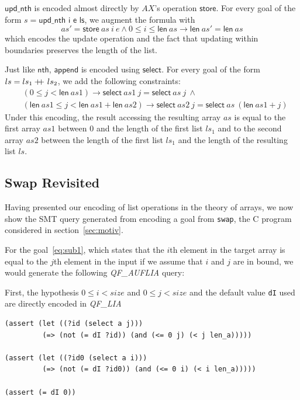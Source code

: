 \documentclass[onecolumn, preprint]{sigplanconf}
\newcommand\doubleplus{+\kern-1.3ex+\kern0.8ex}
\begin{document}
$\textsf{upd\_nth}$ is encoded almost directly by $AX$'s operation $\textsf{store}$. For every goal of the form $s = \textsf{upd\_nth\ i\ e\ ls}$, we augment the formula with
$$ as' = \textsf{store}\ as\ i\ e \wedge 0 \leq i \leq \textsf{len}\ as \to \textsf{len}\ as' = \textsf{len}\ as$$
which encodes the update operation and the fact that updating within boundaries preserves the length of the list.


Just like $\textsf{nth}$, $\textsf{append}$ is encoded using $\textsf{select}$. For every goal of the form $ls = ls_1 \doubleplus ls_2$, we add the following constraints:
\begin{align*}
&(0 \leq j < \textsf{len}\ as1) \to \textsf{select}\ as1\ j = \textsf{select}\ as\ j\ \wedge \\
&(\textsf{len}\ as1 \leq j < \textsf{len}\ as1 + \textsf{len}\ as2) \to \textsf{select}\ as2\ j = \textsf{select}\ as\ (\textsf{len}\ as1 + j)
  \end{align*}
Under this encoding, the result accessing the resulting array $as$ is equal to the first array $as1$ between $0$ and the length of the first list $ls_1$ and to the second array $as2$ between the length of the first list $ls_1$ and the length of the resulting list $ls$.


\subsection{Swap Revisited}

Having presented our encoding of list operations in the theory of arrays, we now show the SMT query generated from encoding a goal from \texttt{swap}, the C program considered in section~\ref{sec:motiv}. 

For the goal~\ref{eq:sub1}, which states that the $i$th element in the target array is equal to the $j$th element in the input if we assume that $i$ and $j$ are in bound, we would generate the following \emph{QF\_AUFLIA} query:

First, the hypothesis $0 \leq i < size$ and $0 \leq j < size$ and the default value \texttt{dI} used are directly encoded in \emph{QF\_LIA}
\begin{lstlisting}
(assert (let ((?id (select a j)))
         (=> (not (= dI ?id)) (and (<= 0 j) (< j len_a)))))

(assert (let ((?id0 (select a i)))
         (=> (not (= dI ?id0)) (and (<= 0 i) (< i len_a)))))

(assert (= dI 0)) 
\end{lstlisting}
\end{document}

